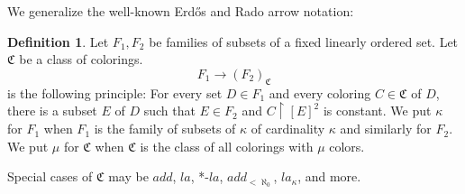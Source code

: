 \documentclass[11pt]{amsart}
\theoremstyle{plain}
\theoremstyle{definition} %
\newtheorem{definition}[theorem]{Definition}
\theoremstyle{remark}
\begin{document}
We generalize the well-known Erd\H{o}s and Rado arrow notation:
\begin{definition}
Let $F_1,F_2$ be families of subsets of a fixed linearly ordered set. Let $\mathfrak{C}$ be a class of colorings.
\[
F_1 \rightarrow  (F_2)_\mathfrak{C}
\]
is the following principle:
For every set $D \in F_1$ and every coloring $C \in \mathfrak{C}$ of $D$, there is a subset $E$ of $D$
such that $E \in F_2$ and $C \restriction [E]^2$ is constant. We put $\kappa$ for $F_1$ when $F_1$ is the family of subsets of $\kappa$ of cardinality $\kappa$ and similarly for $F_2$. We put $\mu$ for $\mathfrak{C}$ when $\mathfrak{C}$ is the class of all colorings with $\mu$ colors.


\end{definition}
Special cases of $\mathfrak{C}$ may be $add$, $la$, *-$la$, $add_{<\aleph_0}$, $la_{\kappa}$,
 and more.






































































\end{document}
